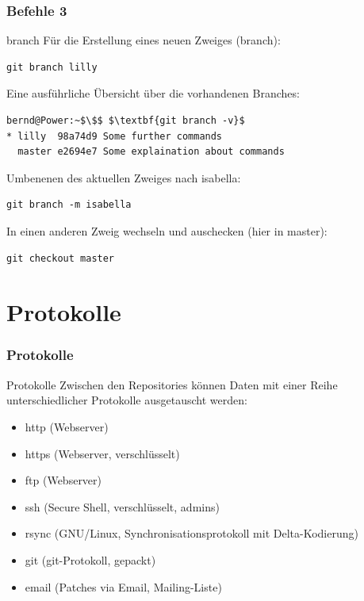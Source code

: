 \documentclass{beamer}
\begin{document}
\begin{frame}[fragile]\frametitle{Befehle 3}
\begin{block} {branch}
Für die Erstellung eines neuen Zweiges (branch):
\begin{lstlisting}
git branch lilly
\end{lstlisting}

Eine ausführliche Übersicht über die vorhandenen Branches:
\begin{lstlisting}[mathescape=true]
bernd@Power:~$\$$ $\textbf{git branch -v}$
* lilly  98a74d9 Some further commands
  master e2694e7 Some explaination about commands
\end{lstlisting} %

Umbenenen des aktuellen Zweiges nach isabella:
\begin{lstlisting}
git branch -m isabella
\end{lstlisting}

In einen anderen Zweig wechseln und auschecken (hier in master):
\begin{lstlisting}
git checkout master
\end{lstlisting}

\end{block}
\end{frame}

\section{Protokolle}

\begin{frame}[fragile]\frametitle{Protokolle}
\begin{block} {Protokolle}
Zwischen den Repositories können Daten mit einer Reihe unterschiedlicher Protokolle ausgetauscht werden:
\begin{itemize}
\item http (Webserver)
\item https (Webserver, verschlüsselt)
\item ftp (Webserver)
\item ssh (Secure Shell, verschlüsselt, admins)
\item rsync (GNU/Linux, Synchronisationsprotokoll mit Delta-Kodierung)
\item git (git-Protokoll, gepackt)
\item email (Patches via Email, Mailing-Liste)
\end{itemize}
\end{block}
\end{frame}
\end{document}
